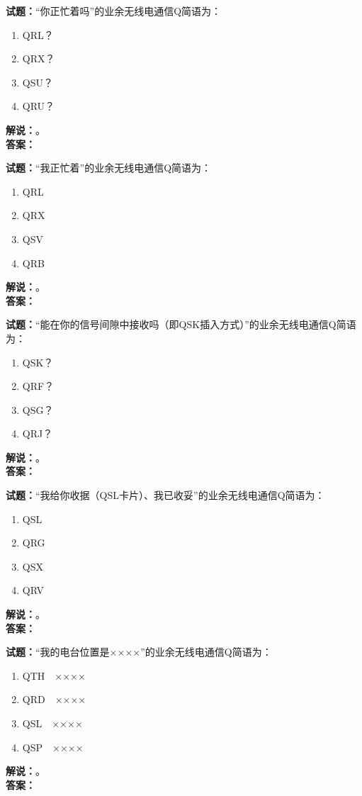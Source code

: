 \documentclass{ctexbook}
\begin{document}
\bigskip

\noindent\textbf{试题：}“你正忙着吗”的业余无线电通信Q简语为：
\begin{enumerate}[leftmargin=3em]
  \item QRL？
  \item QRX？
  \item QSU？
  \item QRU？
\end{enumerate}
\noindent\textbf{解说：}\textbf{}。\\\noindent\textbf{答案：}

\bigskip

\noindent\textbf{试题：}“我正忙着”的业余无线电通信Q简语为：
\begin{enumerate}[leftmargin=3em]
  \item QRL
  \item QRX
  \item QSV
  \item QRB
\end{enumerate}
\noindent\textbf{解说：}\textbf{}。\\\noindent\textbf{答案：}

\bigskip

\noindent\textbf{试题：}“能在你的信号间隙中接收吗（即QSK插入方式）”的业余无线电通信Q简语为：
\begin{enumerate}[leftmargin=3em]
  \item QSK？
  \item QRF？
  \item QSG？
  \item QRJ？
\end{enumerate}
\noindent\textbf{解说：}\textbf{}。\\\noindent\textbf{答案：}

\bigskip

\noindent\textbf{试题：}“我给你收据（QSL卡片）、我已收妥”的业余无线电通信Q简语为：
\begin{enumerate}[leftmargin=3em]
  \item QSL
  \item QRG
  \item QSX
  \item QRV
\end{enumerate}
\noindent\textbf{解说：}\textbf{}。\\\noindent\textbf{答案：}

\bigskip

\noindent\textbf{试题：}“我的电台位置是××××”的业余无线电通信Q简语为：
\begin{enumerate}[leftmargin=3em]
  \item QTH　××××
  \item QRD　××××
  \item QSL　××××
  \item QSP　××××
\end{enumerate}
\noindent\textbf{解说：}\textbf{}。\\\noindent\textbf{答案：}
\end{document}
